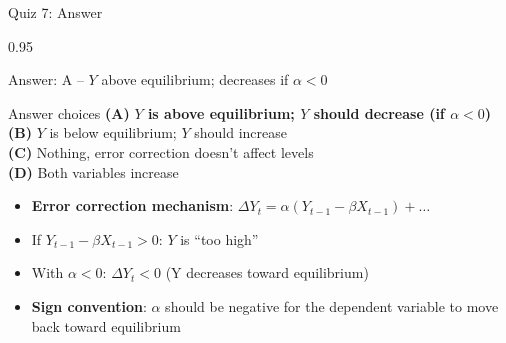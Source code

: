 \documentclass[9pt, aspectratio=169, t]{beamer}
\begin{document}
\begin{frame}{Quiz 7: Answer}
    \begin{cminipage}{0.95\textwidth}
    {\small
    \begin{exampleblock}{Answer: A -- $Y$ above equilibrium; decreases if $\alpha < 0$}

    \begin{block}{Answer choices}
        \textcolor{MainBlue}{\textbf{(A)}} \textbf{\textcolor{Forest}{$Y$ is above equilibrium; $Y$ should decrease (if $\alpha < 0$)}} \correct\\[3pt]
        \textcolor{MainBlue}{\textbf{(B)}} $Y$ is below equilibrium; $Y$ should increase \incorrect\\[3pt]
        \textcolor{MainBlue}{\textbf{(C)}} Nothing, error correction doesn't affect levels \incorrect\\[3pt]
        \textcolor{MainBlue}{\textbf{(D)}} Both variables increase \incorrect
    \end{block}

        \vspace{0.2cm}

        \begin{itemize}
            \item \textbf{Error correction mechanism}: $\Delta Y_t = \alpha(Y_{t-1} - \beta X_{t-1}) + \ldots$
            \item If $Y_{t-1} - \beta X_{t-1} > 0$: $Y$ is ``too high''
            \item With $\alpha < 0$: $\Delta Y_t < 0$ (Y decreases toward equilibrium)
            \item \textbf{Sign convention}: $\alpha$ should be negative for the dependent variable to move back toward equilibrium
        \end{itemize}
    \end{exampleblock}
    }
    \end{cminipage}
\end{frame}
\end{document}
